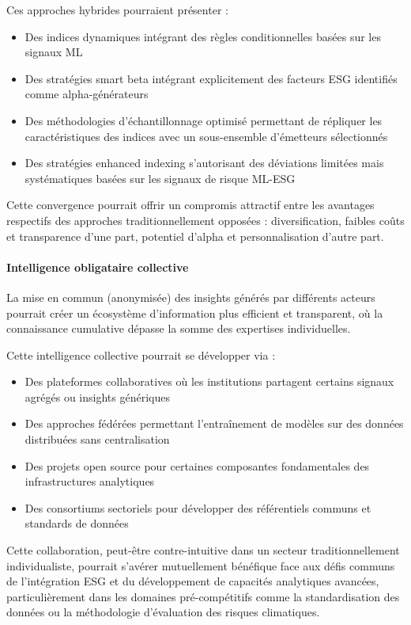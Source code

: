 Ces approches hybrides pourraient présenter :
\begin{itemize}
    \item Des indices dynamiques intégrant des règles conditionnelles basées sur les signaux ML
    \item Des stratégies smart beta intégrant explicitement des facteurs ESG identifiés comme alpha-générateurs
    \item Des méthodologies d'échantillonnage optimisé permettant de répliquer les caractéristiques des indices avec un sous-ensemble d'émetteurs sélectionnés
    \item Des stratégies enhanced indexing s'autorisant des déviations limitées mais systématiques basées sur les signaux de risque ML-ESG
\end{itemize}

Cette convergence pourrait offrir un compromis attractif entre les avantages respectifs des approches traditionnellement opposées : diversification, faibles coûts et transparence d'une part, potentiel d'alpha et personnalisation d'autre part.

\paragraph{Intelligence obligataire collective} 

La mise en commun (anonymisée) des insights générés par différents acteurs pourrait créer un écosystème d'information plus efficient et transparent, où la connaissance cumulative dépasse la somme des expertises individuelles.

Cette intelligence collective pourrait se développer via :
\begin{itemize}
    \item Des plateformes collaboratives où les institutions partagent certains signaux agrégés ou insights génériques
    \item Des approches fédérées permettant l'entraînement de modèles sur des données distribuées sans centralisation
    \item Des projets open source pour certaines composantes fondamentales des infrastructures analytiques
    \item Des consortiums sectoriels pour développer des référentiels communs et standards de données
\end{itemize}

Cette collaboration, peut-être contre-intuitive dans un secteur traditionnellement individualiste, pourrait s'avérer mutuellement bénéfique face aux défis communs de l'intégration ESG et du développement de capacités analytiques avancées, particulièrement dans les domaines pré-compétitifs comme la standardisation des données ou la méthodologie d'évaluation des risques climatiques.

